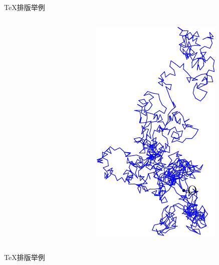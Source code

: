 \documentclass[xcolor=table,svgnames]{beamer}
\begin{document}
\begin{frame}{\TeX{}排版举例}
\begin{columns}
\begin{column}{.45\textwidth}
\begin{figure}[h]
      \end{figure}
    \end{column}
    \begin{column}{.45\textwidth}
      \begin{figure}[h]
        \centering
        \includegraphics[height=.75\textheight]{randomwalk.pdf}
      \end{figure}
    \end{column}
  \end{columns}
\end{frame}

\begin{frame}{\TeX{}排版举例}
\end{frame}
\end{document}

